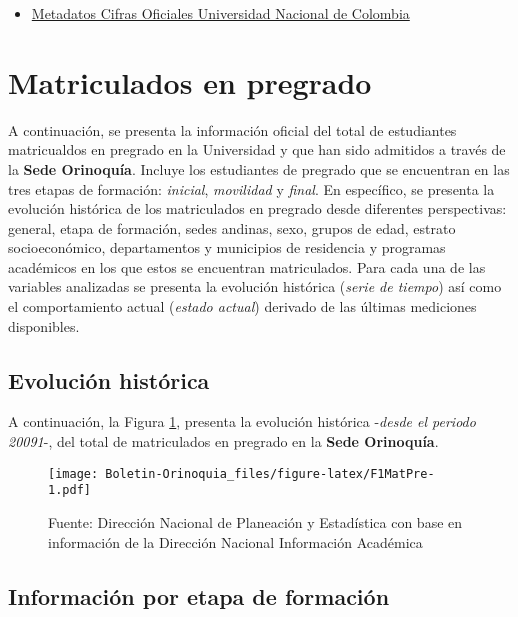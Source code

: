 \documentclass[
]{book}
\providecommand{\tightlist}{%
  \setlength{\itemsep}{0pt}\setlength{\parskip}{0pt}}
\begin{document}
\begin{itemize}
\tightlist
\item
  \href{http://estadisticas.unal.edu.co/menu-principal/cifras-generales/metadatos/cifras-generales/}{Metadatos Cifras Oficiales Universidad Nacional de Colombia}
\end{itemize}

\hypertarget{MatPre}{%
\section{Matriculados en pregrado}\label{MatPre}}

A continuación, se presenta la información oficial del total de estudiantes matricualdos en pregrado en la Universidad y que han sido admitidos a través de la \textbf{Sede Orinoquía}. Incluye los estudiantes de pregrado que se encuentran en las tres etapas de formación: \emph{inicial}, \emph{movilidad} y \emph{final}. En específico, se presenta la evolución histórica de los matriculados en pregrado desde diferentes perspectivas: general, etapa de formación, sedes andinas, sexo, grupos de edad, estrato socioeconómico, departamentos y municipios de residencia y programas académicos en los que estos se encuentran matriculados. Para cada una de las variables analizadas se presenta la evolución histórica (\emph{serie de tiempo}) así como el comportamiento actual (\emph{estado actual}) derivado de las últimas mediciones disponibles.

\hypertarget{evoluciuxf3n-histuxf3rica-2}{%
\subsection{Evolución histórica}\label{evoluciuxf3n-histuxf3rica-2}}

A continuación, la Figura \ref{fig:F1MatPre}, presenta la evolución histórica -\emph{desde el periodo 20091}-, del total de matriculados en pregrado en la \textbf{Sede Orinoquía}.

\begin{figure}
\centering
\texttt{[image: Boletin-Orinoquia\_files/figure-latex/F1MatPre-1.pdf]}
\caption{\label{fig:F1MatPre}Fuente: Dirección Nacional de Planeación y Estadística con base en información de la Dirección Nacional Información Académica}
\end{figure}

\hypertarget{informaciuxf3n-por-etapa-de-formaciuxf3n}{%
\subsection{Información por etapa de formación}\label{informaciuxf3n-por-etapa-de-formaciuxf3n}}
\end{document}
